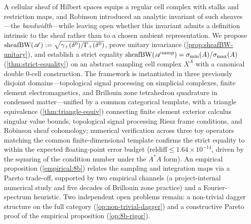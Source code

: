 
A cellular sheaf of Hilbert spaces equips a regular cell complex with
stalks and restriction maps, and Robinson \cite[\S 6]{Robinson2014}
introduced an analytic invariant of such sheaves---the
\emph{bandwidth}---while leaving open whether this invariant admits a
definition intrinsic to the sheaf rather than to a chosen ambient
representation.
We propose
$\operatorname{sheafBW}(\mathscr{A}) := \sqrt{\gamma_+(\delta^0)/\Gamma_+(\delta^0)}$,
prove unitary invariance (\cref{prop:sheafBW-unitary}), and establish
a strict equality
$\operatorname{sheafBW}(\mathscr{A}^{\mathrm{samp}}) = \sigma_{\min}(A)/\sigma_{\max}(A)$
(\cref{thm:strict-equality}) on an abstract sampling cell complex
$X^A$ with a canonical double $0$-cell construction. The framework
is instantiated in three previously disjoint domains---topological
signal processing on simplicial complexes, finite element
electromagnetics, and Brillouin zone tetrahedron quadrature in
condensed matter---unified by a common categorical template, with a
triangle equivalence (\cref{thm:triangle-equiv}) connecting finite
element exterior calculus singular value bounds, topological signal
processing Riesz frame conditions, and Robinson sheaf cohomology;
numerical verification across three toy operators matching the common
finite-dimensional template confirms the strict equality to within the
expected floating-point error budget ($\mathrm{reldiff} \le 1.64
\times 10^{-14}$, driven by the squaring of the condition number under
the $A^* A$ form). An empirical
proposition (\cref{empirical:8b}) relates the sampling and
integration maps via a Pareto trade-off, supported by two
empirical channels (a project-internal numerical study and five
decades of Brillouin zone practice) and a Fourier-spectrum
heuristic. Two independent open problems remain: a
non-trivial dagger structure on the full category
(\cref{op:non-trivial-dagger}) and a constructive Pareto proof of the
empirical proposition (\cref{op:8b-rigor}).
